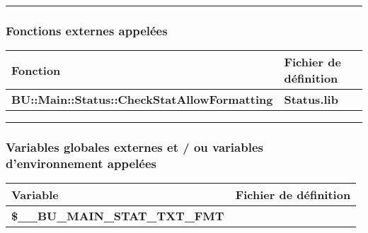 \documentclass[a4paper,10pt]{article}
\begin{document}
\setlength{\parskip}{2em}



\color{sec3}\par\noindent\rule{\textwidth}{0.4pt}\color{text}\setlength{\parskip}{1em}

\color{sec3}
\subsubsection{Fonctions externes appelées}\color{text}

\begin{justify}
    \begin{tabular}{|l|l|}
        \hline
        \textbf{Fonction} & \textbf{Fichier de définition}\\
        \hline
        \textbf{\color{func}BU::Main::Status::CheckStatAllowFormatting} & \textbf{\color{path}Status.lib}\\
        \hline
    \end{tabular}
\end{justify}

\setlength{\parskip}{2em}



\color{sec3}\par\noindent\rule{\textwidth}{0.4pt}\color{text}\setlength{\parskip}{1em}

\color{sec3}
\subsubsection{Variables globales externes et / ou variables d'environnement appelées}\color{text}

\begin{justify}
    \begin{tabular}{|l|l|}
        \hline
        \textbf{Variable} & \textbf{Fichier de définition}\\
        \hline
        \textbf{\color{vars}\$\_\_BU\_MAIN\_STAT\_TXT\_FMT} & \textbf{\color{path}}\\
        \hline
    \end{tabular}
\end{justify}

\setlength{\parskip}{2em}


\end{document}
